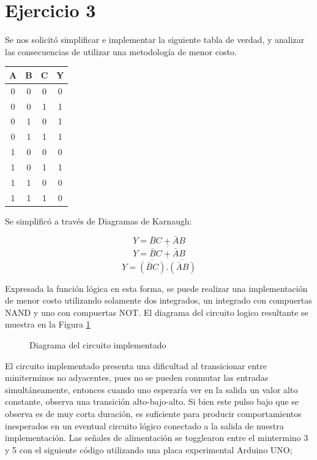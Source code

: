 \part*{Ejercicio 3}

Se nos solicitó simplificar e implementar la siguiente tabla de verdad, y analizar las consecuencias de utilizar una metodología de menor costo.

\begin{center}
\begin{tabular}{ccc|c}
A & B & C & Y \\ 
\hline
0 & 0 & 0 & 0 \\  
0 & 0 & 1 & 1 \\  
0 & 1 & 0 & 1 \\  
0 & 1 & 1 & 1 \\  
1 & 0 & 0 & 0 \\  
1 & 0 & 1 & 1 \\  
1 & 1 & 0 & 0 \\  
1 & 1 & 1 & 0 \\  
\end{tabular} 
\end{center}

Se simplificó a través de Diagramas de Karnaugh:

\begin{center}
\begin{Karnaughvuit}
   \indeterminats{}
\end{Karnaughvuit}
\end{center}

\[Y = \bar{B}C + \bar{A}B \]
\[Y = \overline{\overline{\bar{B}C + \bar{A}B}} \]
\[Y = \overline{\overline{(\bar{B}C)}.\overline{(\bar{A}B)}} \]

Expresada la función lógica en esta forma, se puede realizar una implementación de menor costo utilizando solamente dos integrados, un integrado con compuertas NAND y uno con compuertas NOT. El diagrama del circuito logico resultante se muestra en la Figura \ref{3_fig1}

\begin{figure}[H]
\begin{center}

\caption{Diagrama del circuito implementado} \label{3_fig1}
\end{center}
\end{figure}

El circuito implementado presenta una dificultad al transicionar entre miniterminos no adyacentes, pues no se pueden conmutar las entradas simultáneamente, entonces cuando uno esperaría ver en la salida un valor alto constante, observa una transición alto-bajo-alto. Si bien este pulso bajo que se observa es de muy corta duración, es suficiente para producir comportamientos inesperados en un eventual circuito lógico conectado a la salida de nuestra implementación. 
Las señales de alimentación se togglearon entre el mintermino 3 y 5 con el siguiente código utilizando una placa experimental Arduino UNO;

